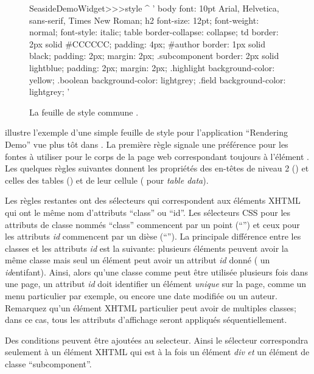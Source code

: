 \documentclass[a4paper,10pt,twoside]{book}
\begin{document}
\begin{figure}[tb]
\begin{code}{}
SeasideDemoWidget>>>style
	^ '
body {
	font: 10pt Arial, Helvetica, sans-serif, Times New Roman;
}
h2 {
	font-size: 12pt;
	font-weight: normal;
	font-style: italic;
}
table { border-collapse: collapse; }
td {
	border: 2px solid #CCCCCC;
	padding: 4px;
}
#author {
	border: 1px solid black;
	padding: 2px;
	margin: 2px;
}
.subcomponent {
	border: 2px solid lightblue;
	padding: 2px;
	margin: 2px;
}
.highlight { background-color: yellow; }
.boolean { background-color: lightgrey; }
.field { background-color: lightgrey; }
'
\end{code}
\caption{La feuille de style commune .
}
\end{figure}
 illustre l'exemple d'une simple feuille de style pour
l'application ``Rendering Demo'' vue plus tôt dans
.
La première règle signale une préférence pour les fontes à utiliser
pour le corps de la page web correspondant toujours à l'élément .
Les quelques règles suivantes donnent les propriétés des en-têtes de
niveau 2 () et celles des tables () et de leur
cellule ( pour \emph{table data}).

Les règles restantes ont des sélecteurs qui correspondent aux éléments
XHTML qui ont le même nom d'attributs ``class'' ou ``id''.
Les sélecteurs CSS pour les attributs de classe nommés ``class''
commencent par un point (``'') et ceux pour les attributs \emph{id}
commencent par un dièse (``\ct{#}'').
La principale différence entre les classes et les attributs \emph{id}
est la suivante: plusieurs éléments peuvent avoir la même classe mais
seul un élément peut avoir un attribut \emph{id} donné (\ie{} un
\emph{id}{entifant}).
Ainsi, alors qu'une classe comme  peut être utilisée
plusieurs fois dans une page, un attribut \emph{id} doit identifier un
élément \emph{unique} sur la page, comme un menu particulier par
exemple, ou encore une date modifiée ou un auteur.
Remarquez qu'un élément XHTML particulier peut avoir de multiples
classes; dans ce cas, tous les attributs d'affichage seront appliqués
séquentiellement.


Des conditions peuvent être ajoutées au selecteur. Ainsi le sélecteur
 correspondra seulement à un élément XHTML qui
est à la fois un élément \emph{div} \emph{et} un élément de classe
``subcomponent''.
\end{document}
